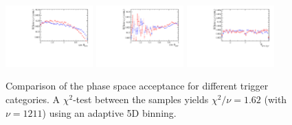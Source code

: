 \begin{figure}[h]
\includegraphics[height=!,width=0.3\textwidth]{figs/AcceptancePhsp/eff_cosTheta_Kpi_trigger.pdf}
\includegraphics[height=!,width=0.3\textwidth]{figs/AcceptancePhsp/eff_cosTheta_Dspi_trigger.pdf}
\includegraphics[height=!,width=0.3\textwidth]{figs/AcceptancePhsp/eff_phi_Kpi_Dspi_trigger.pdf}

\caption{Comparison of the phase space acceptance for different trigger categories.
A $\chi^2$-test between the samples yields $\chi^2/\nu = 1.62$ (with $\nu =  1211$) using an adaptive 5D binning.
 }
\label{fig:PhspEffTrigger}
\end{figure}

